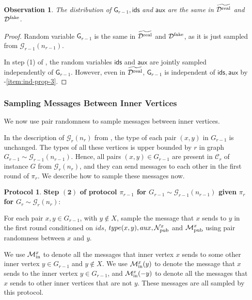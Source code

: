 \documentclass[11pt]{article}
\newtheorem{observation}[lemma]{Observation}
\theoremstyle{definition}
\newtheorem{mdprotocol}{Protocol}
\newenvironment{Protocol}{\begin{tbox}\begin{mdprotocol}}{\end{mdprotocol}\end{tbox}}
\newenvironment{tbox}{\begin{tcolorbox}[
		enlarge top by=5pt,
		enlarge bottom by=5pt,
		 breakable,
		 boxsep=0pt,
                  left=4pt,
                  right=4pt,
                  top=10pt,
                  arc=4pt,
                  boxrule=1pt,toprule=1pt,
                  colback=white
                  ]%
	}
{\end{tcolorbox}}
\newcommand{\rv}[1]{\ensuremath{{\mathsf{#1}}}\xspace}
\newcounter{mybox}
\renewcommand{\themybox}{\arabic{mybox}}
\newcommand{\namethebox}{\begin{center}\textbf{Box~\themybox} \end{center}}
\newcommand{\prot}{\ensuremath{\pi}}
\newcommand{\cC}{\ensuremath{\mathcal{C}}}
\newcommand{\typeval}[1]{\ensuremath{type(#1)}}
\newcommand{\cD}{\ensuremath{\mathcal{D}}}
\newcommand{\cG}{\ensuremath{\mathcal{G}}}
\newcommand{\cDreal}{\ensuremath{\cD^{\textnormal{real}}}}
\newcommand{\cDrealtil}{\ensuremath{\widetilde{\cDreal}}}
\newcommand{\cDfake}{\ensuremath{\cD^{\textnormal{fake}}}}
\newcommand{\ids}{\ensuremath{ids}}
\newcommand{\aux}{\ensuremath{aux}}
\newcommand{\raux}{\ensuremath{\rv{aux}}}
\newcommand{\Npub}[1]{\ensuremath{\mathcal{N}_{\textnormal{pub}}^{#1}}}
\newcommand{\Mpub}[1]{\ensuremath{\mathcal{M}_{\textnormal{pub}}^{#1}}}
\newcommand{\Minner}[1]{\ensuremath{\mathcal{M}_{\textnormal{in}}^{#1}}}
\newcommand{\rG}{\ensuremath{\rv{G}}}
\newcommand{\rids}{\ensuremath{\rv{ids}}}
\begin{document}
\begin{observation}\label{obs:real-fake-ids-same}
	The distribution of $\rG_{r-1}, \rids$ and $\raux$ are the same in $\cDrealtil$ and $\cDfake$. 
\end{observation}
\begin{proof}
	Random variable $\rG_{r-1}$ is the same in $\cDrealtil$ and $\cDfake$, as it is just sampled from $\cG_{r-1}(n_{r-1})$.
	
	In step (1) of , the random variables $\rids$ and $\raux$ are jointly sampled independently of $\rG_{r-1}$. However, even in $\cDrealtil$, $\rG_{r-1}$ is independent of $ \rids, \raux$ by -\ref{item:ind-prop-3}. 
\end{proof}


\subsubsection{Sampling Messages Between Inner Vertices}

We now use pair randomness to sample messages between inner vertices. 

In the description of $\cG_r(n_r)$ from , the type of each pair $(x, y)$ in $G_{r-1}$ is unchanged. The types of all these vertices is upper bounded by $r$ in graph $G_{r-1} \sim \cG_{r-1}(n_{r-1})$. Hence, all pairs $(x, y) \in G_{r-1}$ are present in $\cC_r$ of instance $G$ from $\cG_r(n_r)$, and they can send messages to each other in the first round of $\prot_r$. We describe how to sample these messages now. 



\begin{Protocol}\label{box:r-1-step2-inner-msgs} 
	\textbf{Step $\bm{(2)}$ of protocol $\prot_{r-1}$ for $G_{r-1} \sim \cG_{r-1}(n_{r-1})$ given $\prot_{r}$ for $G_{r} \sim \cG_r(n_r)$}:
	\vspace{2mm}
	
For each pair $x,y \in G_{r-1}$, with $y \notin X$,  sample the message that $x$ sends to $y$ in the first round conditioned on $\ids$, $\typeval{x, y}, \aux, \Npub{x}$ and $\Mpub{x}$ using pair randomness between $x$ and $y$.

\bigskip

We use $\Minner{x}$ to denote all the messages that inner vertex $x$ sends to some other inner vertex $y \in G_{r-1}$ and $y \notin X$. We use $\Minner{x}(y)$ to denote the message that $x$ sends to the inner vertex $y \in G_{r-1}$, and 
$\Minner{x}(-y)$ to denote all the messages that $x$ sends to other inner vertices that are not $y$. These messages are all sampled by this protocol.  
\end{Protocol}
\end{document}
